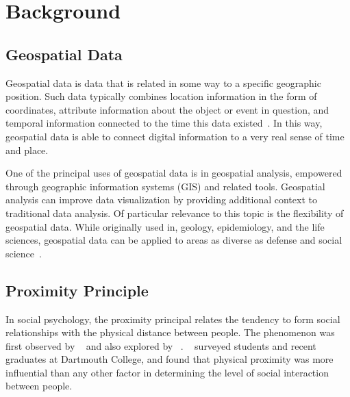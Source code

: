 \section{Background}

\subsection{Geospatial Data}

Geospatial data is data that is related in some way to a specific geographic position. Such data typically combines location information in the form of coordinates, attribute information about the object or event in question, and temporal information connected to the time this data existed~\cite{ibm}. In this way, geospatial data is able to connect digital information to a very real sense of time and place.

One of the principal uses of geospatial data is in geospatial analysis, empowered through geographic information systems (\textsc{GIS}) and related tools. Geospatial analysis can improve data visualization by providing additional context to traditional data analysis. Of particular relevance to this topic is the flexibility of geospatial data. While originally used in, geology, epidemiology, and the life sciences, geospatial data can be applied to areas as diverse as defense and social science~\cite{ibm}.

\subsection{Proximity Principle}

In social psychology, the proximity principal relates the tendency to form social relationships with the physical distance between people. The phenomenon was first observed by \citeauthor{newcomb_1960}~\cite{newcomb_1960} and also explored by \citeauthor{festinger_1950}~\cite{festinger_1950}. \citeauthor{marmaros_2006}~\cite{marmaros_2006} surveyed students and recent graduates at Dartmouth College, and found that physical proximity was more influential than any other factor in determining the level of social interaction between people.
